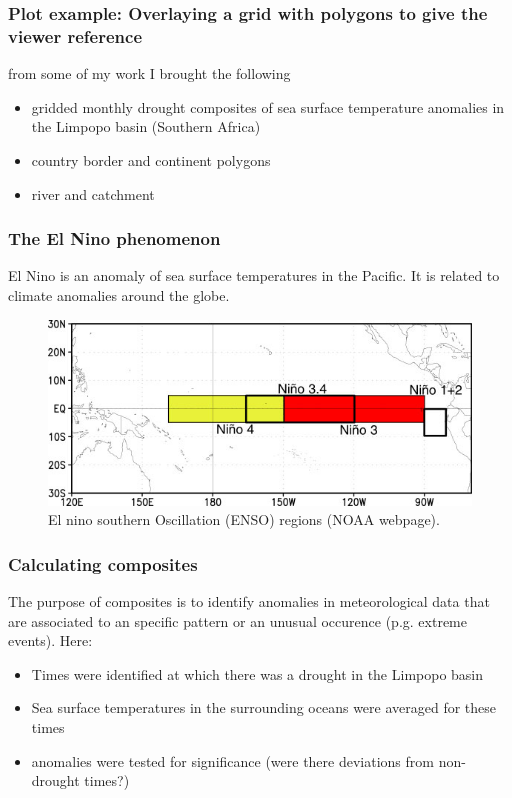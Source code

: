 \documentclass[xcolor=table, xcolor=dvipsnames]{beamer}\usepackage[]{graphicx}\usepackage[]{color}
\begin{document}

\begin{frame}[fragile]\frametitle{Plot example: Overlaying a grid with polygons to give the viewer reference}
from some of my work I brought the following
\pause
\begin{itemize}[<+->]
\item gridded monthly drought composites of sea surface temperature anomalies in the Limpopo basin (Southern Africa)
\item country border and continent polygons
\item river and catchment
\end{itemize}
\end{frame}


\begin{frame}[fragile]\frametitle{The El Nino phenomenon}
  El Nino is an anomaly of sea surface temperatures in the Pacific. It is related to climate anomalies around the globe.
  \begin{figure}[h]
    \begin{center}
    \includegraphics[width=.8\linewidth]{./externalfig/ninoareas_c.jpg}
    \caption{El nino southern Oscillation (ENSO) regions (NOAA webpage).}
  	\label{fig:ensoreg}
    \end{center}
	\end{figure}
\end{frame}


\begin{frame}[fragile]\frametitle{Calculating composites}
The purpose of composites is to identify anomalies in meteorological data that are associated to an specific pattern or an unusual occurence (p.g. extreme events). Here:
\pause
\begin{itemize}[<+->]
\item Times were identified at which there was a drought in the Limpopo basin
\item Sea surface temperatures in the surrounding oceans were averaged for these times
\item anomalies were tested for significance (were there deviations from non-drought times?)
\end{itemize}
\end{frame}
\end{document}
